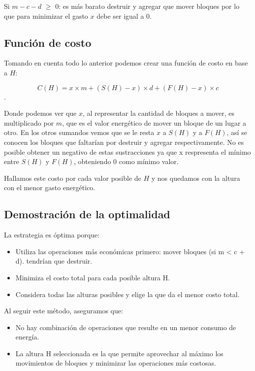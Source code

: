 \documentclass[a4paper,12pt]{article}
\begin{document}
Si \(m - c - d \) $\geq$ \(0\): es más barato destruir y agregar que mover bloques por lo que para minimizar el gasto \(x\) debe ser igual a \(0\).

\subsection{Función de costo}

Tomando en cuenta todo lo anterior podemos crear una función de costo en base a \(H\):

\[C(H) =  x \times m + (S(H) -  x) \times d + (F(H) - x) \times c\].

Donde podemos ver que \(x\), al representar la cantidad de bloques a mover, es multiplicado por \(m\), que es el valor energético de mover un bloque de un lugar a otro. En los otros sumandos vemos que se le resta \(x\) a \(S(H)\) y a \(F(H)\), así se conocen los bloques que faltarían por destruir y agregar respectivamente. No es posible obtener un negativo de estas sustracciones ya que x respresenta el mínimo entre \(S(H)\) y \(F(H)\), obteniendo 0 como mínimo valor.

Hallamos este costo por cada valor posible de \(H\) y nos quedamos con la altura con el menor gasto energético.

\subsection{Demostración de la optimalidad}
La estrategia es óptima porque:
\begin{itemize}
	\item Utiliza las operaciones más económicas primero: mover bloques (si m < c + d). tendrían que destruir.
	\item Minimiza el costo total para cada posible altura H.
	\item Considera todas las alturas posibles y elige la que da el menor costo total.
\end{itemize}

Al seguir este método, aseguramos que:

\begin{itemize}
	\item No hay combinación de operaciones que resulte en un menor consumo de energía.
	\item La altura H seleccionada es la que permite aprovechar al máximo los movimientos de bloques y minimizar las operaciones más costosas.
\end{itemize}
\end{document}
